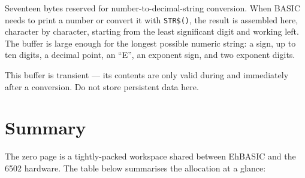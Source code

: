 
Seventeen bytes reserved for number-to-decimal-string conversion.  When BASIC
needs to print a number or convert it with \texttt{STR\$()}, the result is
assembled here, character by character, starting from the least significant
digit and working left.  The buffer is large enough for the longest possible
numeric string: a sign, up to ten digits, a decimal point, an ``E'', an
exponent sign, and two exponent digits.

This buffer is transient --- its contents are only valid during and
immediately after a conversion.  Do not store persistent data here.

\section*{Summary}

The zero page is a tightly-packed workspace shared between EhBASIC and the
6502 hardware.  The table below summarises the allocation at a glance:

